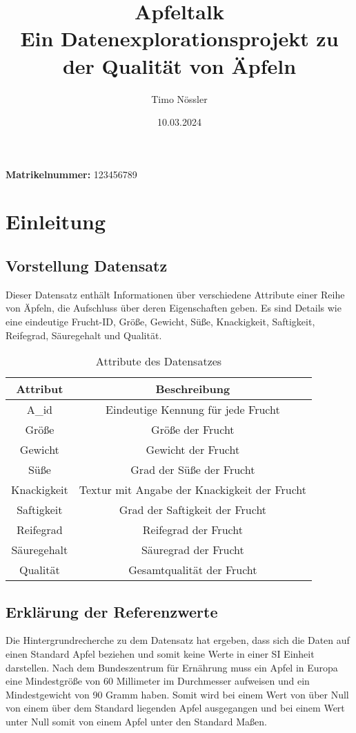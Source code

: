 \documentclass{article}
\title{\Huge Apfeltalk \\
\large Ein Datenexplorationsprojekt zu der Qualität von Äpfeln }
\author{Timo Nössler}
\date{\vspace{2cm}10.03.2024}
\begin{document}
\clearpage\maketitle
\thispagestyle{empty}
\begin{center}
\textbf{Matrikelnummer:} 123456789
\end{center}
\newpage
\renewcommand{\contentsname}{Inhaltsverzeichnis}
\tableofcontents
\newpage


\section{Einleitung}
\subsection{Vorstellung Datensatz}
Dieser Datensatz enthält Informationen über verschiedene Attribute einer Reihe von Äpfeln, die Aufschluss über deren Eigenschaften geben. Es sind Details wie eine eindeutige Frucht-ID, Größe, Gewicht, Süße, Knackigkeit, Saftigkeit, Reifegrad, Säuregehalt und Qualität. 
\begin{table}[h]
\centering
\begin{tabular}{|c|c|}
\hline
\textbf{Attribut} & \textbf{Beschreibung} \\
\hline
A\_id & Eindeutige Kennung für jede Frucht \\
Größe & Größe der Frucht \\
Gewicht & Gewicht der Frucht \\
Süße & Grad der Süße der Frucht \\
Knackigkeit & Textur mit Angabe der Knackigkeit der Frucht \\
Saftigkeit & Grad der Saftigkeit der Frucht \\
Reifegrad & Reifegrad der Frucht \\
Säuregehalt & Säuregrad der Frucht \\
Qualität & Gesamtqualität der Frucht \\
\hline
\end{tabular}
\caption{Attribute des Datensatzes}
\end{table}


\subsection{Erklärung der Referenzwerte}
Die Hintergrundrecherche zu dem Datensatz hat ergeben, dass sich die Daten auf einen Standard Apfel beziehen und somit keine Werte in einer SI Einheit darstellen. Nach dem Bundeszentrum für Ernährung muss ein Apfel in Europa eine Mindestgröße von 60 Millimeter im Durchmesser aufweisen und ein Mindestgewicht von 90 Gramm haben. Somit wird bei einem Wert von über Null von einem über dem Standard liegenden Apfel ausgegangen und bei einem Wert unter Null somit von einem Apfel unter den Standard Maßen.
\end{document}
